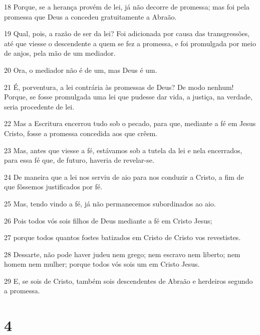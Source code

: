 \par 18 Porque, se a herança provém de lei, já não decorre de promessa; mas foi pela promessa que Deus a concedeu gratuitamente a Abraão.
\par 19 Qual, pois, a razão de ser da lei? Foi adicionada por causa das transgressões, até que viesse o descendente a quem se fez a promessa, e foi promulgada por meio de anjos, pela mão de um mediador.
\par 20 Ora, o mediador não é de um, mas Deus é um.
\par 21 É, porventura, a lei contrária às promessas de Deus? De modo nenhum! Porque, se fosse promulgada uma lei que pudesse dar vida, a justiça, na verdade, seria procedente de lei.
\par 22 Mas a Escritura encerrou tudo sob o pecado, para que, mediante a fé em Jesus Cristo, fosse a promessa concedida aos que crêem.
\par 23 Mas, antes que viesse a fé, estávamos sob a tutela da lei e nela encerrados, para essa fé que, de futuro, haveria de revelar-se.
\par 24 De maneira que a lei nos serviu de aio para nos conduzir a Cristo, a fim de que fôssemos justificados por fé.
\par 25 Mas, tendo vindo a fé, já não permanecemos subordinados ao aio.
\par 26 Pois todos vós sois filhos de Deus mediante a fé em Cristo Jesus;
\par 27 porque todos quantos fostes batizados em Cristo de Cristo vos revestistes.
\par 28 Dessarte, não pode haver judeu nem grego; nem escravo nem liberto; nem homem nem mulher; porque todos vós sois um em Cristo Jesus.
\par 29 E, se sois de Cristo, também sois descendentes de Abraão e herdeiros segundo a promessa.

\chapter{4}

